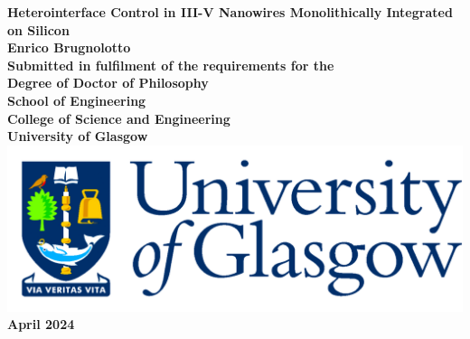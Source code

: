 \documentclass[12pt,titlepage,oneside]{book} %
\begin{document}
\begin{titlepage}
\centering
\vspace*{3cm}  %
\bfseries\Large
Heterointerface Control in III-V Nanowires Monolithically Integrated on Silicon\\
\vspace{3cm}
\normalfont\large
Enrico Brugnolotto\\
\vspace{2cm}
Submitted in fulfilment of the requirements for the\\
Degree of Doctor of Philosophy\\
\vspace{2cm}
School of Engineering\\
College of Science and Engineering\\
University of Glasgow\\
\vspace{1cm}
\includegraphics[scale=0.125]{GlaLogo.pdf}
\\
\vspace{1cm}
April 2024
\end{titlepage}
\frontmatter  %

\tableofcontents
\listoftables
\listoffigures
\printglossaries




\mainmatter %








\appendix
% 


\backmatter  %

\printbibliography
\end{document}
